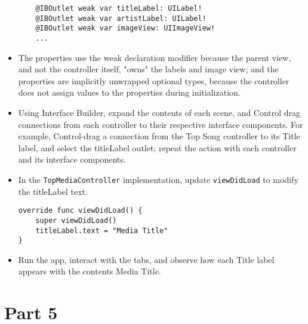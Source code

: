\documentclass[a4paper,11pt]{scrartcl}
\begin{document}
\begin{itemize}
\begin{lstlisting}
	@IBOutlet weak var titleLabel: UILabel!
	@IBOutlet weak var artistLabel: UILabel!
	@IBOutlet weak var imageView: UIImageView!
	...
\end{lstlisting}
\item The properties use the weak declaration modifier because the parent view, and not the controller itself, "owns" the labels and image view; and the properties are implicitly unwrapped optional types, because the controller does not assign values to the properties during initialization.
\item Using Interface Builder, expand the contents of each scene, and Control drag connections from each controller to their respective interface components. For example, Control-drag a connection from the Top Song controller to its Title label, and select the titleLabel outlet; repeat the action with each controller and its interface components.
\item In the \texttt{TopMediaController} implementation, update \texttt{viewDidLoad} to modify the titleLabel text.
\begin{lstlisting}
override func viewDidLoad() {
	super viewDidLoad()
	titleLabel.text = "Media Title"
}
\end{lstlisting}
\item Run the app, interact with the tabs, and observe how each Title label appears with the contents Media Title.
\end{itemize}

\section*{Part 5}
\end{document}
